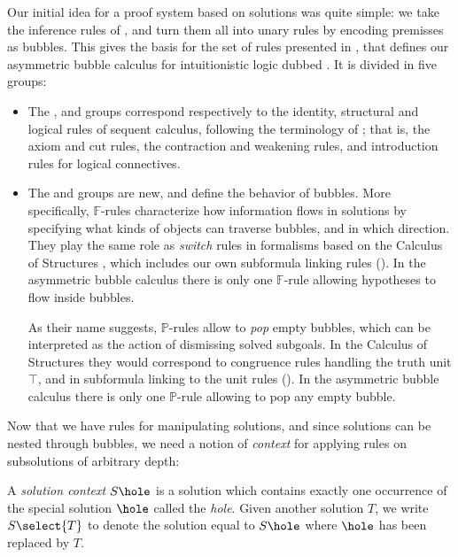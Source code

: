 Our initial idea for a proof system based on solutions was quite simple: we take
the inference rules of , and turn them all into unary rules by encoding
premisses as bubbles. This gives the basis for the set of rules presented in
, that defines our asymmetric bubble
calculus for intuitionistic logic dubbed . It is divided in five groups:
\begin{itemize}
  \item The {\identity}, {\resource} and {\heating} groups correspond
  respectively to the identity, structural and logical rules of sequent
  calculus, following the terminology of ; that
  is, the axiom and cut rules, the contraction and weakening rules, and
  introduction rules for logical connectives.
  \item The {\flow} and {\popping} groups are new, and define the behavior of
  bubbles.
  More specifically, $\mathbb{F}$-rules characterize how information flows in
  solutions by specifying what kinds of objects can traverse bubbles, and in
  which direction. They play the same role as \emph{switch} rules in formalisms
  based on the Calculus of Structures \cite{Guglielmi1999ACO}, which includes
  our own subformula linking rules (). In the asymmetric bubble
  calculus there is only one $\mathbb{F}$-rule {} allowing
  hypotheses to flow inside bubbles.
  
  As their name suggests, $\mathbb{P}$-rules allow to \emph{pop} empty bubbles,
  which can be interpreted as the action of dismissing solved subgoals. In the
  Calculus of Structures they would correspond to congruence rules handling the
  truth unit $\top$, and in subformula linking to the unit rules
  (). In the asymmetric bubble calculus there is only one
  $\mathbb{P}$-rule {} allowing to pop any empty bubble.
\end{itemize}

Now that we have rules for manipulating solutions, and since solutions can be
nested through bubbles, we need a notion of \emph{context} for applying rules on
subsolutions of arbitrary depth:

\begin{definition}
  A \emph{solution context} $S\hole$ is a solution which contains exactly one
  occurrence of the special solution $\hole$ called the \emph{hole}. Given
  another solution $T$, we write $S\select{T}$ to denote the solution equal to
  $S\hole$ where $\hole$ has been replaced by $T$.
\end{definition}

